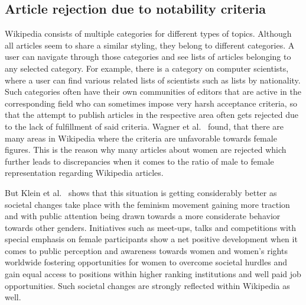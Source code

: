 \documentclass[a4paper, 11pt]{article}
\begin{document}
\subsection{Article rejection due to notability criteria} \label{sec:gender-gap-wikipedia:notability}
Wikipedia consists of multiple categories for different types of topics. Although all articles seem to share a similar styling, they belong to different categories. A user can navigate through those categories and see lists of articles belonging to any selected category. For example, there is a category on computer scientists, where a user can find various related lists of scientists such as lists by nationality. Such categories often have their own communities of editors that are active in the corresponding field who can sometimes impose very harsh acceptance criteria, so that the attempt to publish articles in the respective area often gets rejected due to the lack of fulfillment of said criteria. Wagner et al.~\cite{wagner2016women} found, that there are many areas in Wikipedia where the criteria are unfavorable towards female figures. This is the reason why many articles about women are rejected which further leads to discrepancies when it comes to the ratio of male to female representation regarding Wikipedia articles.

But Klein et al.~\cite{klein2016monitoring} shows that this situation is getting considerably better as societal changes take place with the feminism movement gaining more traction and with public attention being drawn towards a more considerate behavior towards other genders. Initiatives such as meet-ups, talks and competitions with special emphasis on female participants show a net positive development when it comes to public perception and awareness towards women and women’s rights worldwide fostering opportunities for women to overcome societal hurdles and gain equal access to positions within higher ranking institutions and well paid job opportunities. Such societal changes are strongly reflected within Wikipedia as well.
\end{document}
